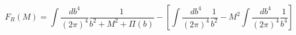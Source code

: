 \begin{equation}
    F_{R}(M)=\int
\frac{db^{4}}{(2\pi)^{4}} \frac{1}{b^{2}+M^{2}+\Pi(b)}-\left[\int
\frac{db^{4}}{(2\pi)^{4}} \frac{1}{b^{2}}-M^{2}\int
\frac{db^{4}}{(2\pi)^{4}} \frac{1}{b^{4}}\right]
\end{equation}

